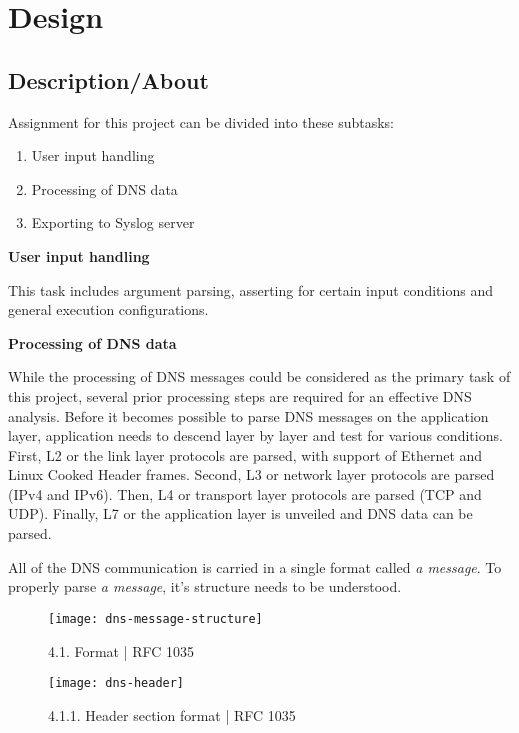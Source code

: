\section{Design}

\subsection{Description/About}

Assignment for this project can be divided into these subtasks:
\begin{enumerate}
\item User input handling
\item Processing of DNS data
\item Exporting to Syslog server
\end{enumerate}

\vspace{1cm}
\textbf{User input handling}

This task includes argument parsing, asserting for certain input conditions and general execution configurations.

\vspace{1cm}
\textbf{Processing of DNS data}

While the processing of DNS messages could be considered as the primary task of this project, several prior processing steps are required for an effective DNS analysis.
Before it becomes possible to parse DNS messages on the application layer, application needs to descend layer by layer and test for various conditions.
First, L2 or the link layer protocols are parsed, with support of Ethernet and Linux Cooked Header frames. Second, L3 or network layer protocols are parsed (IPv4 and IPv6).
Then, L4 or transport layer protocols are parsed (TCP and UDP). Finally, L7 or the application layer is unveiled and DNS data can be parsed.

\vspace{0.5cm}

All of the DNS communication is carried in a single format called \textit{a message}.
To properly parse \textit{a message}, it's structure needs to be understood.

\begin{figure}[h]
\texttt{[image: dns-message-structure]}
\centering
\caption{4.1. Format | RFC 1035}
\end{figure}

\pagebreak

\begin{figure}[h]
\texttt{[image: dns-header]}
\centering
\caption{4.1.1. Header section format | RFC 1035}
\end{figure}

